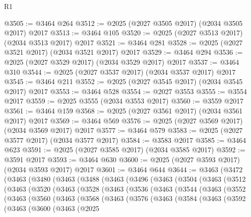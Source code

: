 \begin{lexlean}{R1}
\begin{coremodule}
@3505 := @3464 @264
@3512 := @2025 (@2027 @3505 @2017) (@2034 @3505 @2017) @2017
@3513 := @3464 @105
@3520 := @2025 (@2027 @3513 @2017) (@2034 @3513 @2017) @2017
@3521 := @3464 @281
@3528 := @2025 (@2027 @3521 @2017) (@2034 @3521 @2017) @2017
@3529 := @3464 @294
@3536 := @2025 (@2027 @3529 @2017) (@2034 @3529 @2017) @2017
@3537 := @3464 @310
@3544 := @2025 (@2027 @3537 @2017) (@2034 @3537 @2017) @2017
@3545 := @3464 @211
@3552 := @2025 (@2027 @3545 @2017) (@2034 @3545 @2017) @2017
@3553 := @3464 @528
@3554 := @2027 @3553
@3555 := @3554 @2017
@3559 := @2025 @3555 (@2034 @3553 @2017)
@3560 := @3559 @2017
@3561 := @3464 @159
@3568 := @2025 (@2027 @3561 @2017) (@2034 @3561 @2017) @2017
@3569 := @3464 @569
@3576 := @2025 (@2027 @3569 @2017) (@2034 @3569 @2017) @2017
@3577 := @3464 @579
@3583 := @2025 (@2027 @3577 @2017) (@2034 @3577 @2017)
@3584 := @3583 @2017
@3585 := @3464 @623
@3591 := @2025 (@2027 @3585 @2017) (@2034 @3585 @2017)
@3592 := @3591 @2017
@3593 := @3464 @630
@3600 := @2025 (@2027 @3593 @2017) (@2034 @3593 @2017) @2017
@3601 := @3464 @644
@3644 := @3463
    (@3472
      (@3463
        (@3480
          (@3463
            (@3488
              (@3463
                (@3496
                  (@3463
                    (@3504
                      (@3463
                        (@3512
                          (@3463
                            (@3520
                              (@3463
                                (@3528
                                  (@3463
                                    (@3536
                                      (@3463
                                        (@3544
                                          (@3463
                                            (@3552
                                              (@3463
                                                (@3560
                                                  (@3463
                                                    (@3568
                                                      (@3463
                                                        (@3576
                                                          (@3463
                                                            (@3584
                                                              (@3463
                                                                (@3592
                                                                  (@3463
                                                                    (@3600
                                                                      (@3463
                                                                        (@2025

\end{coremodule}
\end{lexlean}

